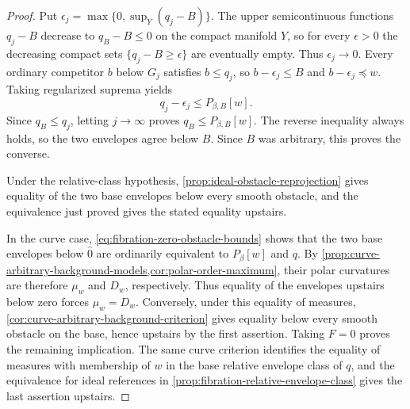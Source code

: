 \begin{proof}
Put $\epsilon_j=\max\{0,\sup_Y(q_j-B)\}$. The upper semicontinuous functions $q_j-B$ decrease to $q_B-B\leq0$ on the compact manifold $Y$, so for every $\epsilon>0$ the decreasing compact sets $\{q_j-B\geq\epsilon\}$ are eventually empty. Thus $\epsilon_j\to0$. Every ordinary competitor $b$ below $G_j$ satisfies $b\leq q_j$, so $b-\epsilon_j\leq B$ and $b-\epsilon_j\preceq w$. Taking regularized suprema yields
\[
 q_j-\epsilon_j\leq P_{\beta,B}[w].
\]
Since $q_B\leq q_j$, letting $j\to\infty$ proves $q_B\leq P_{\beta,B}[w]$. The reverse inequality always holds, so the two envelopes agree below $B$. Since $B$ was arbitrary, this proves the converse.

Under the relative-class hypothesis, \cref{prop:ideal-obstacle-reprojection} gives equality of the two base envelopes below every smooth obstacle, and the equivalence just proved gives the stated equality upstairs.

In the curve case, \eqref{eq:fibration-zero-obstacle-bounds} shows that the two base envelopes below $\widehat 0$ are ordinarily equivalent to $P_\beta[w]$ and $q$. By \cref{prop:curve-arbitrary-background-models,cor:polar-order-maximum}, their polar curvatures are therefore $\mu_w$ and $D_w$, respectively. Thus equality of the envelopes upstairs below zero forces $\mu_w=D_w$. Conversely, under this equality of measures, \cref{cor:curve-arbitrary-background-criterion} gives equality below every smooth obstacle on the base, hence upstairs by the first assertion. Taking $F=0$ proves the remaining implication. The same curve criterion identifies the equality of measures with membership of $w$ in the base relative envelope class of $q$, and the equivalence for ideal references in \cref{prop:fibration-relative-envelope-class} gives the last assertion upstairs.
\end{proof}

